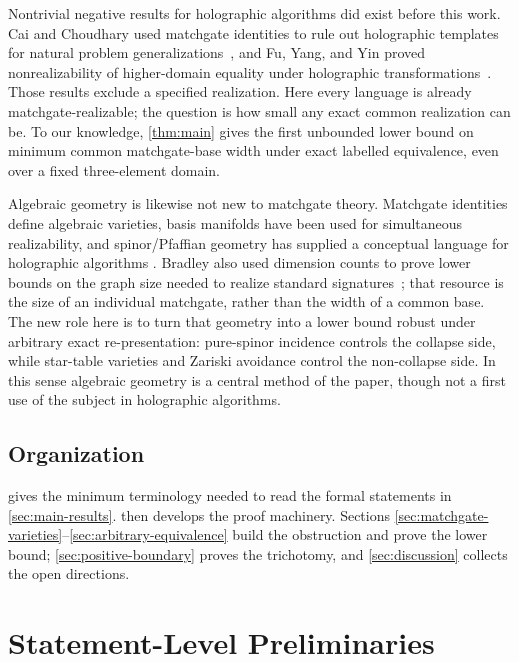 \documentclass[11pt]{article}
\theoremstyle{definition}
\theoremstyle{remark}
\begin{document}
Nontrivial negative results for holographic algorithms did exist before this
work.  Cai and Choudhary used matchgate identities to rule out holographic
templates for natural problem generalizations~\cite{CaiChoudhary2007}, and
Fu, Yang, and Yin proved nonrealizability of higher-domain equality under
holographic transformations~\cite{FuYangYin2019}.  Those results exclude a
specified realization.  Here every language is already matchgate-realizable;
the question is how small any exact common realization can be.  To our
knowledge, \cref{thm:main} gives the first unbounded lower bound on minimum
common matchgate-base width under exact labelled equivalence, even over a
fixed three-element domain.

Algebraic geometry is likewise not new to matchgate theory.  Matchgate
identities define algebraic varieties, basis manifolds have been used for
simultaneous realizability, and spinor/Pfaffian geometry has supplied a
conceptual language for holographic algorithms
\cite{CaiChoudharyLu2009,CaiLu2011,LandsbergMortonNorine2013,Bravyi2009}.
Bradley also used dimension counts to prove lower bounds on the graph size
needed to realize standard signatures~\cite{Bradley2009}; that resource is
the size of an individual matchgate, rather than the width of a common base.
The new role here is to turn that geometry into a lower bound robust under
arbitrary exact re-presentation: pure-spinor incidence controls the collapse
side, while star-table varieties and Zariski avoidance control the
non-collapse side.  In this sense algebraic geometry is a central method of
the paper, though not a first use of the subject in holographic algorithms.

\subsection{Organization}

 gives the minimum terminology needed to
read the formal statements in \cref{sec:main-results}.
 then develops the proof machinery.
Sections \ref{sec:matchgate-varieties}--\ref{sec:arbitrary-equivalence}
build the obstruction and prove the lower bound;
\cref{sec:positive-boundary} proves the trichotomy, and
\cref{sec:discussion} collects the open directions.

\section{Statement-Level Preliminaries}
\label{sec:statement-preliminaries}
\end{document}
